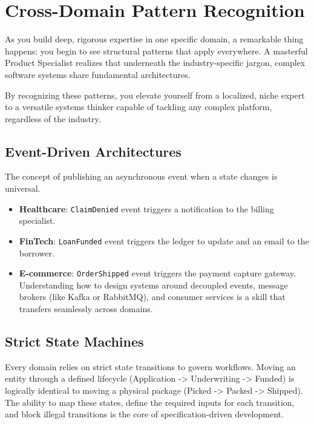 \bigskip

\section{Cross-Domain Pattern
Recognition}\label{cross-domain-pattern-recognition}

As you build deep, rigorous expertise in one specific domain, a
remarkable thing happens: you begin to see structural patterns that
apply everywhere. A masterful Product Specialist realizes that
underneath the industry-specific jargon, complex software systems share
fundamental architectures.

By recognizing these patterns, you elevate yourself from a localized,
niche expert to a versatile systems thinker capable of tackling any
complex platform, regardless of the industry.

\subsection{Event-Driven
Architectures}\label{event-driven-architectures}

The concept of publishing an asynchronous event when a state changes is
universal.

\begin{itemize}
\tightlist
\item
  \textbf{Healthcare}: \texttt{ClaimDenied} event triggers a
  notification to the billing specialist.
\item
  \textbf{FinTech}: \texttt{LoanFunded} event triggers the ledger to
  update and an email to the borrower.
\item
  \textbf{E-commerce}: \texttt{OrderShipped} event triggers the payment
  capture gateway. Understanding how to design systems around decoupled
  events, message brokers (like Kafka or RabbitMQ), and consumer
  services is a skill that transfers seamlessly across domains.
\end{itemize}

\subsection{Strict State Machines}\label{strict-state-machines}

Every domain relies on strict state transitions to govern workflows.
Moving an entity through a defined lifecycle (Application
-\textgreater{} Underwriting -\textgreater{} Funded) is logically
identical to moving a physical package (Picked -\textgreater{} Packed
-\textgreater{} Shipped). The ability to map these states, define the
required inputs for each transition, and block illegal transitions is
the core of specification-driven development.

